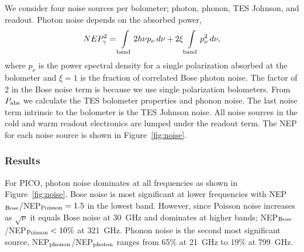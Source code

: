 \documentclass[]{spie}  %
\begin{document}
We consider four noise sources per bolometer; photon, phonon, TES Johnson, and readout. 
Photon noise depends on the absorbed power\cite{richards1994}, 
\begin{equation}
\label{eq:photon}
NEP_{\gamma}^2 = \int\limits_{\rm band} 2h\nu p_{\nu} \, d\nu + 2\xi \int\limits_{\rm band} p_{\nu}^2 \,  d\nu,
\end{equation} 
where $p_{\nu}$ is the power spectral density for a single polarization absorbed at the bolometer and $\xi=1$ is the fraction of correlated Bose 
photon noise. The factor of 2 in the Bose noise term is because we use single polarization bolometers.  
%
%
From $P_{\rm abs}$ we calculate the TES bolometer properties and phonon noise.\cite{mather1982}  
The last noise term intrinsic to the bolometer is the TES Johnson noise. All noise sources in the cold and warm readout 
electronics are lumped under the readout term.  The NEP for each noise source is shown in Figure~\ref{fig:noise}.



\subsubsection{Results}  %

For PICO, photon noise dominates at all frequencies as shown in Figure~\ref{fig:noise}. Bose noise is most significant 
at lower frequencies with NEP$_{\rm Bose}$/NEP$_{\rm Poisson}= 1.5 $ in the lowest band.  However, since Poisson noise increases as 
$\sqrt{\nu}$ it equals Bose noise at 30~GHz and dominates at higher bands; NEP$_{\rm Bose}$/NEP$_{\rm Poisson} <10\%$ at 321~GHz. 
Phonon noise is the second most significant source, NEP$_{\rm phonon}$/NEP$_{\rm photon}$ ranges from 65\% at 21~GHz 
to 19\% at 799~GHz. 
\end{document}
